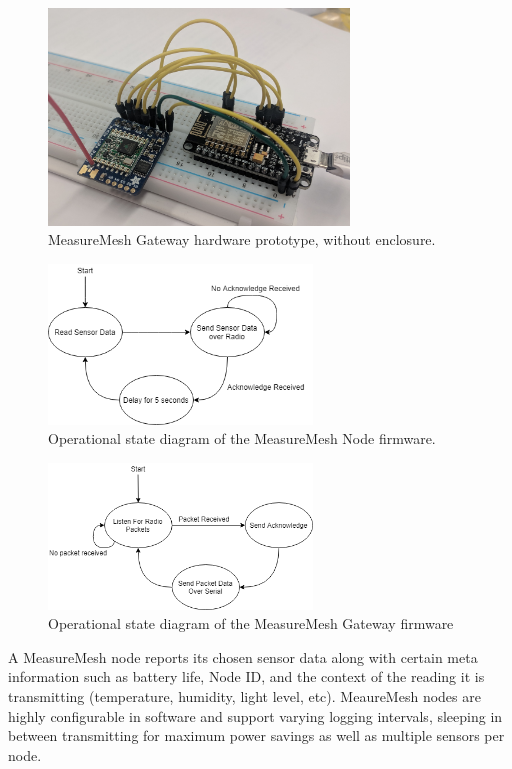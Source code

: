 \documentclass{IEEEtran}
\begin{document}
\begin{figure}
    \centering
    \includegraphics[width=8cm]{images/gatewayPrototype.jpg}
    \caption{MeasureMesh Gateway hardware prototype, without enclosure.}
    \label{fig:gatewayproto}
\end{figure}


\begin{figure}
    \centering
    \includegraphics[width=7cm]{images/NodeOperation}
    \caption{Operational state diagram of the MeasureMesh Node firmware.}
    \label{fig:nodeop}
\end{figure}

\begin{figure}
    \centering
    \includegraphics[width=7cm]{images/GatewayOperation}
    \caption{Operational state diagram of the MeasureMesh Gateway firmware}
    \label{fig:gateop}
\end{figure}


A MeasureMesh node reports its chosen sensor data along with certain meta information such as battery life, Node ID, and the context of the reading it is transmitting (temperature, humidity, light level, etc). MeaureMesh nodes are highly configurable in software and support varying logging intervals, sleeping in between transmitting for maximum power savings as well as multiple sensors per node. 
\end{document}
